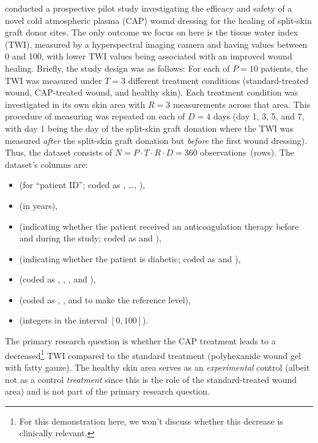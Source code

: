 \citet{welzen_response_2021} conducted a prospective pilot study
investigating the efficacy and safety of a novel cold atmospheric plasma (CAP)
wound dressing for the healing of split-skin graft donor sites. The only
outcome we focus on here is the tissue water index (TWI), measured by a
hyperspectral imaging camera and having values between 0 and 100, with lower
TWI values being associated with an improved wound healing. Briefly, the study
design was as follows: For each of $P = 10$ patients, the TWI was measured
under $T = 3$ different treatment conditions (standard-treated wound,
CAP-treated wound, and healthy skin). Each treatment condition was
investigated in its own skin area with $R = 3$ measurements across that area.
This procedure of measuring was repeated on each of $D = 4$ days (day 1, 3,
5, and 7, with day 1 being the day of the split-skin graft donation where the
TWI was measured \emph{after} the split-skin graft donation but \emph{before}
the first wound dressing). Thus, the dataset consists of $N = P \cdot T \cdot R
\cdot D = 360$ observations~(rows). The dataset's columns are:
\begin{itemize}
  \item {} (for ``patient ID''; coded as , \dots,
  ),

  \item {} (in years),

  \item {} (indicating whether the patient received an
  anticoagulation therapy before and during the study; coded as  and
  ),

  \item {} (indicating whether the patient is diabetic; coded as
   and ),

  \item {} (coded as , , , and
  ),

  \item {} (coded as , , and
   to make  the reference level),

  \item {} (integers in the interval $[0, 100]$).
\end{itemize}

The primary research question is whether the CAP treatment leads to a
decreased\footnote{For this demonstration here, we won't discuss whether this
decrease is clinically relevant.} TWI compared to the standard treatment
(polyhexanide wound gel with fatty gauze). The healthy skin area serves as an
\emph{experimental} control (albeit not as a control \emph{treatment} since
this is the role of the standard-treated wound area) and is not part of the
primary research question.

